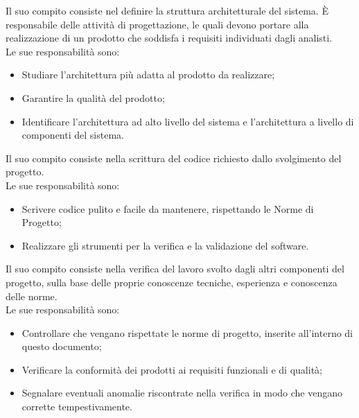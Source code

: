 
            Il suo compito consiste nel definire la struttura architetturale del sistema.
            È responsabile delle attività di progettazione, le quali devono portare alla realizzazione di un prodotto che soddisfa i requisiti individuati dagli analisti.\\
            Le sue responsabilità sono:
            \begin{itemize}
                \item Studiare l'architettura più adatta al prodotto da realizzare;
                \item Garantire la qualità del prodotto;
                \item Identificare l'architettura ad alto livello del sistema e l'architettura a livello di componenti del sistema.
            \end{itemize}


            Il suo compito consiste nella scrittura del codice richiesto dallo svolgimento del progetto. \\
            Le sue responsabilità sono:
            \begin{itemize}
                \item Scrivere codice pulito e facile da mantenere, rispettando le Norme di Progetto;
                \item Realizzare gli strumenti per la verifica e la validazione del software.
            \end{itemize}

            Il suo compito consiste nella verifica del lavoro svolto dagli altri componenti del progetto, sulla base delle proprie conoscenze tecniche, esperienza e conoscenza delle norme. \\
            Le sue responsabilità sono:
            \begin{itemize}
                \item Controllare che vengano rispettate le norme di progetto, inserite all'interno di questo documento;
                \item Verificare la conformità dei prodotti ai requisiti funzionali e di qualità;
                \item Segnalare eventuali anomalie riscontrate nella verifica in modo che vengano corrette tempestivamente.
            \end{itemize}


